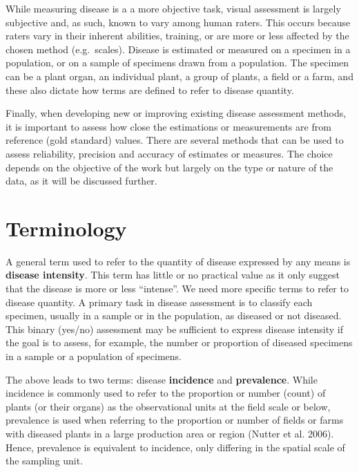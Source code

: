\documentclass[
  letterpaper,
  DIV=11,
  numbers=noendperiod]{scrreprt}
\begin{document}
While measuring disease is a a more objective task, visual assessment is
largely subjective and, as such, known to vary among human raters. This
occurs because raters vary in their inherent abilities, training, or are
more or less affected by the chosen method (e.g.~scales). Disease is
estimated or measured on a specimen in a population, or on a sample of
specimens drawn from a population. The specimen can be a plant organ, an
individual plant, a group of plants, a field or a farm, and these also
dictate how terms are defined to refer to disease quantity.

Finally, when developing new or improving existing disease assessment
methods, it is important to assess how close the estimations or
measurements are from reference (gold standard) values. There are
several methods that can be used to assess reliability, precision and
accuracy of estimates or measures. The choice depends on the objective
of the work but largely on the type or nature of the data, as it will be
discussed further.

\hypertarget{terminology}{%
\section{Terminology}\label{terminology}}

A general term used to refer to the quantity of disease expressed by any
means is \textbf{disease intensity}. This term has little or no
practical value as it only suggest that the disease is more or less
``intense''. We need more specific terms to refer to disease quantity. A
primary task in disease assessment is to classify each specimen, usually
in a sample or in the population, as diseased or not diseased. This
binary (yes/no) assessment may be sufficient to express disease
intensity if the goal is to assess, for example, the number or
proportion of diseased specimens in a sample or a population of
specimens.

The above leads to two terms: disease \textbf{incidence} and
\textbf{prevalence}. While incidence is commonly used to refer to the
proportion or number (count) of plants (or their organs) as the
observational units at the field scale or below, prevalence is used when
referring to the proportion or number of fields or farms with diseased
plants in a large production area or region (Nutter et al. 2006). Hence,
prevalence is equivalent to incidence, only differing in the spatial
scale of the sampling unit.
\end{document}
